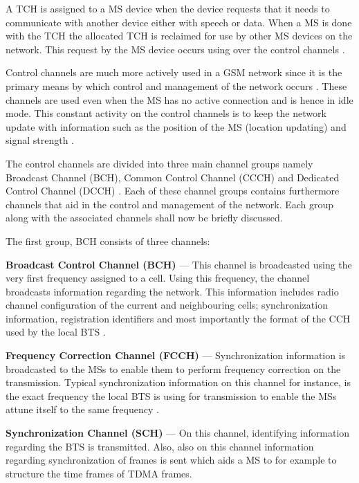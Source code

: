 A TCH is assigned to a MS device when the device requests that it needs to communicate with another device either with speech or data. When a MS is done with the TCH the allocated TCH is reclaimed for use by other MS devices on the network. This request by the MS device occurs using over the control channels \cite{GSMArchitectureProtocolsServices}.

Control channels are much more actively used in a GSM network since it is the primary means by which control and management of the network occurs \cite{GSMArchitectureProtocolsServices}. These channels are used even when the MS has no active connection and is hence in idle mode. This constant activity on the control channels is to keep the network update with information such as the position of the MS (location updating) and signal strength \cite{GSMArchitectureProtocolsServices,GSMSysEngin,Eisenblatter}. 

The control channels are divided into three main channel groups namely Broadcast Channel (BCH), Common Control Channel (CCCH) and Dedicated Control Channel (DCCH) \cite{GSMArchitectureProtocolsServices}. Each of these channel groups contains furthermore channels that aid in the control and management of the network. Each group along with the associated channels shall now be briefly discussed.

The first group, BCH consists of three channels:
\begin{description}
\item{\textbf{Broadcast Control Channel (BCH)}} --- This channel is broadcasted using the very first frequency assigned to a cell. Using this frequency, the channel broadcasts information regarding the network. This information includes radio channel configuration of the current and neighbouring cells; synchronization information, registration identifiers and most importantly the format of the CCH used by the local BTS \cite{GSMArchitectureProtocolsServices}.
\item{\textbf{Frequency Correction Channel (FCCH)}} --- Synchronization information is broadcasted to the MSs to enable them to perform frequency correction on the transmission. Typical synchronization information on this channel for instance, is the exact frequency the local BTS is using for transmission to enable the MSs attune itself to the same frequency \cite{GSMArchitectureProtocolsServices}.
\item{\textbf{Synchronization Channel (SCH)}} --- On this channel, identifying information regarding the BTS is transmitted. Also, also on this channel information regarding synchronization of frames is sent which aids a MS to for example to structure the time frames of TDMA frames.
\end{description}

